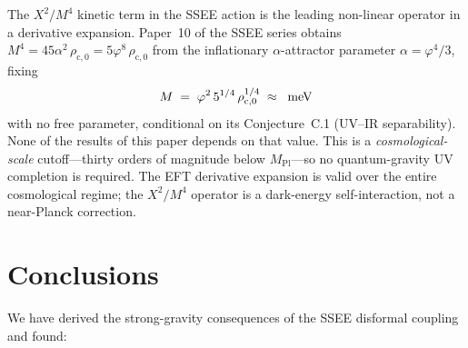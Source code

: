 \documentclass[12pt,a4paper]{article}
\newcommand{\phiG}{\varphi}
\newcommand{\Mpl}{M_{\mathrm{Pl}}}
\newcommand{\rhoc}{\rho_{\mathrm{c},0}}
\begin{document}
The $X^2/M^4$ kinetic term in the SSEE action is the leading non-linear
operator in a derivative expansion.
Paper~10 of the SSEE series obtains
$M^4 = 45\alpha^2\,\rhoc = 5\phiG^8\,\rhoc$ from the inflationary $\alpha$-attractor
parameter $\alpha = \phiG^4/3$, fixing
\begin{equation}
  M \;=\; \phiG^2\,5^{1/4}\,\rhoc^{1/4} \;\approx\; \val{M_meV_d2}\;\mathrm{meV}
\end{equation}
with no free parameter, conditional on its Conjecture~C.1 (UV--IR separability).
None of the results of this paper depends on that value.
This is a \emph{cosmological-scale} cutoff---thirty orders of magnitude
below $\Mpl$---so no quantum-gravity UV completion is required.
The EFT derivative expansion is valid over the entire cosmological regime;
the $X^2/M^4$ operator is a dark-energy self-interaction, not a near-Planck correction.

\section{Conclusions}
\label{sec:conclusions}

We have derived the strong-gravity consequences of the SSEE disformal
coupling and found:
\end{document}
